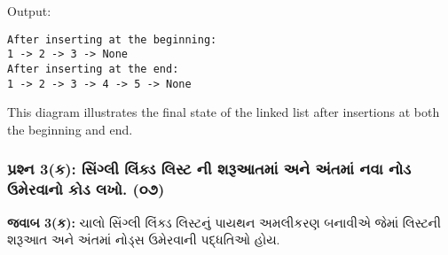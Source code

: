 Output:

\begin{verbatim}
After inserting at the beginning:
1 -> 2 -> 3 -> None
After inserting at the end:
1 -> 2 -> 3 -> 4 -> 5 -> None
\end{verbatim}

\begin{Shaded}
\begin{Highlighting}[]
\end{Highlighting}
\end{Shaded}

This diagram illustrates the final state of the linked list after
insertions at both the beginning and end.

\hypertarget{uxaaauxab0uxab6uxaa8-3uxa95-uxab8uxa97uxab2-uxab2uxa95uxaa1-uxab2uxab8uxa9f-uxaa8-uxab6uxab0uxa86uxaa4uxaae-uxa85uxaa8-uxa85uxaa4uxaae-uxaa8uxab5-uxaa8uxaa1-uxa89uxaaeuxab0uxab5uxaa8-uxa95uxaa1-uxab2uxa96.-uxae6uxaed}{%
\subsubsection{પ્રશ્ન 3(ક): સિંગ્લી લિંક્ડ લિસ્ટ ની શરૂઆતમાં અને અંતમાં નવા નોડ
ઉમેરવાનો કોડ લખો.
(૦૭)}\label{uxaaauxab0uxab6uxaa8-3uxa95-uxab8uxa97uxab2-uxab2uxa95uxaa1-uxab2uxab8uxa9f-uxaa8-uxab6uxab0uxa86uxaa4uxaae-uxa85uxaa8-uxa85uxaa4uxaae-uxaa8uxab5-uxaa8uxaa1-uxa89uxaaeuxab0uxab5uxaa8-uxa95uxaa1-uxab2uxa96.-uxae6uxaed}}

\textbf{જવાબ 3(ક):} ચાલો સિંગ્લી લિંક્ડ લિસ્ટનું પાયથન અમલીકરણ બનાવીએ જેમાં
લિસ્ટની શરૂઆત અને અંતમાં નોડ્સ ઉમેરવાની પદ્ધતિઓ હોય.

